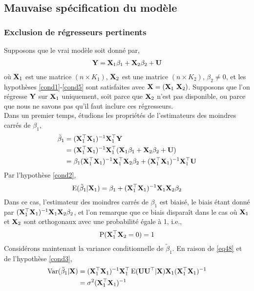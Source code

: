 \subsection{Mauvaise spécification du modèle}
\subsubsection*{Exclusion de régresseurs pertinents}
Supposons que le vrai modèle soit donné par,
\begin{align}
\mathbf Y = \mathbf X_1\beta_1 + \mathbf X_2\beta_2 + \mathbf U
\label{eq49}
\end{align}
où $\mathbf X_1$ est une matrice $(n\times K_1)$, $\mathbf X_2$ est une matrice $(n\times K_2)$, $\beta_2\neq 0$, et les hypothèses \ref{cond1}-\ref{cond5} sont satisfaites avec $\boldX = (\boldX_1 \ \boldX_2)$. Supposons que l'on régresse $\mathbf Y$ sur $\mathbf X_1$ uniquement, soit parce que $\mathbf X_2$ n'est pas disponible, ou parce que nous ne savons pas qu'il faut inclure ces régresseurs.\\
Dans un premier temps, étudions les propriétés de l'estimateurs des moindres carrés de $\beta_1$,
\begin{align*}
\tilde{\beta}_1 &= (\mathbf X_1^\top\mathbf X_1)^{-1}\mathbf X_1^\top\mathbf Y\\
&= (\mathbf X_1^\top\mathbf X_1)^{-1}\mathbf X_1^\top(\mathbf X_1\beta_1 + \mathbf X_2\beta_2+\mathbf U)\\
&=\beta_1(\mathbf X_1^\top\mathbf X_1)^{-1}\mathbf X_1^\top\mathbf X_2\beta_2 + 
(\mathbf X_1^\top\mathbf X_1)^{-1}\mathbf X_1^\top\mathbf U
\end{align*}
Par l'hypothèse \ref{cond2},
\begin{align}
\operatorname{E}(\tilde{\beta}_1 | \mathbf X_1) = \beta_1 + (\mathbf X_1^\top\mathbf X_1)^{-1}\mathbf X_1\mathbf X_2\beta_2
\label{eq48}
\end{align}
Dans ce cas, l'estimateur des moindres carrés de $\beta_1$ est biaisé, le biais étant donné par $(\mathbf X_1^\top\mathbf X_1)^{-1}\mathbf X_1\mathbf X_2\beta_2$, et l'on remarque que ce biais disparaît dans le cas où $\mathbf X_1$ et $\mathbf X_2$ sont orthogonaux avec une probabilité égale à 1, i.e.,
\begin{align*}
\operatorname{P}(\mathbf X_1^\top\mathbf X_2 = 0) = 1
\end{align*}
Considérons maintenant la variance conditionnelle de $\tilde{\beta}_1$. En raison de \eqref{eq48} et de l'hypothèse \ref{cond3},
\begin{align*}
\operatorname{Var}(\tilde{\beta}_1 | \mathbf X) & = (\mathbf X_1^\top\mathbf X_1)^{-1}\mathbf X_1^\top\operatorname{E}(\mathbf U\mathbf U^\top|\mathbf X)\mathbf X_1(\mathbf X_1^\top\mathbf X_1)^{-1}\\
&=\sigma^2(\mathbf X_1^\top\mathbf X_1)^{-1}
\end{align*}
